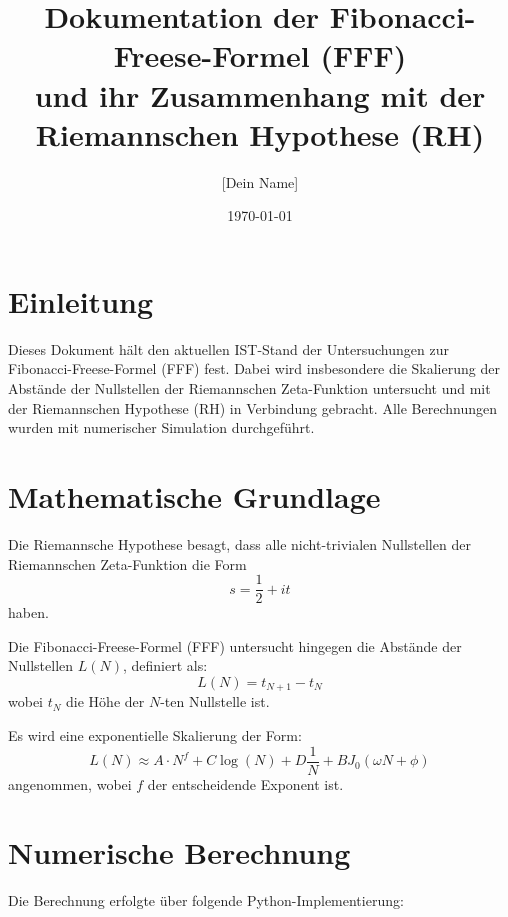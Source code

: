 \documentclass[a4paper,11pt]{article}
\title{Dokumentation der Fibonacci-Freese-Formel (FFF) \\ und ihr Zusammenhang mit der Riemannschen Hypothese (RH)}
\author{[Dein Name]}
\date{\today}
\begin{document}
\maketitle

\section{Einleitung}

Dieses Dokument hält den aktuellen IST-Stand der Untersuchungen zur Fibonacci-Freese-Formel (FFF) fest. Dabei wird insbesondere die Skalierung der Abstände der Nullstellen der Riemannschen Zeta-Funktion untersucht und mit der Riemannschen Hypothese (RH) in Verbindung gebracht. Alle Berechnungen wurden mit numerischer Simulation durchgeführt.

\section{Mathematische Grundlage}

Die Riemannsche Hypothese besagt, dass alle nicht-trivialen Nullstellen der Riemannschen Zeta-Funktion die Form 
\[
s = \frac{1}{2} + i t
\]
haben. 

Die Fibonacci-Freese-Formel (FFF) untersucht hingegen die Abstände der Nullstellen \( L(N) \), definiert als:
\[
L(N) = t_{N+1} - t_N
\]
wobei \( t_N \) die Höhe der \( N \)-ten Nullstelle ist.

Es wird eine exponentielle Skalierung der Form:
\[
L(N) \approx A \cdot N^f + C \log(N) + D \frac{1}{N} + B J_0(\omega N + \phi)
\]
angenommen, wobei \( f \) der entscheidende Exponent ist.

\section{Numerische Berechnung}

Die Berechnung erfolgte über folgende Python-Implementierung:
\end{document}
